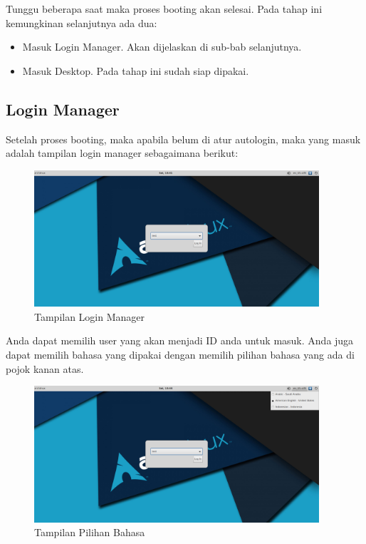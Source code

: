 \documentclass[12pt,]{article}
\begin{document}
	Tunggu beberapa saat maka proses booting akan selesai. Pada tahap ini kemungkinan selanjutnya ada dua:

	\begin{itemize}
		\item Masuk Login Manager. Akan dijelaskan di sub-bab selanjutnya.
		\item Masuk Desktop. Pada tahap ini sudah siap dipakai.
	\end{itemize}

	\newpage

	\subsection{Login Manager}

	Setelah proses booting, maka apabila belum di atur autologin, maka yang masuk adalah tampilan login manager sebagaimana berikut:

	\begin{figure}[h]
		\centering
		\includegraphics[width=300pt]{png/login}
		\caption{Tampilan Login Manager}
	\end{figure}

	Anda dapat memilih user yang akan menjadi ID anda untuk masuk.
	Anda juga dapat memilih bahasa yang dipakai dengan memilih pilihan bahasa yang ada di pojok kanan atas.

	\begin{figure}[h]
		\centering
		\includegraphics[width=300pt]{png/login_lang}
		\caption{Tampilan Pilihan Bahasa}
	\end{figure}
\end{document}

